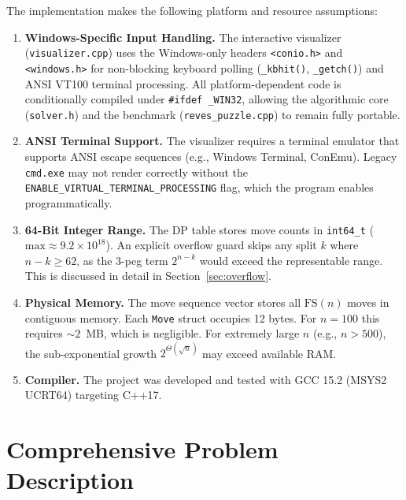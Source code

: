 \documentclass[12pt, a4paper]{article}
\begin{document}
The implementation makes the following platform and resource assumptions:

\begin{enumerate}[leftmargin=2em]

\item \textbf{Windows-Specific Input Handling.}
The interactive visualizer (\texttt{visualizer.cpp}) uses the Windows-only headers \texttt{<conio.h>} and \texttt{<windows.h>} for non-blocking keyboard polling (\texttt{\_kbhit()}, \texttt{\_getch()}) and ANSI VT100 terminal processing.
All platform-dependent code is conditionally compiled under \texttt{\#ifdef \_WIN32}, allowing the algorithmic core (\texttt{solver.h}) and the benchmark (\texttt{reves\_puzzle.cpp}) to remain fully portable.

\item \textbf{ANSI Terminal Support.}
The visualizer requires a terminal emulator that supports ANSI escape sequences (e.g., Windows Terminal, ConEmu).
Legacy \texttt{cmd.exe} may not render correctly without the \texttt{ENABLE\_VIRTUAL\_TERMINAL\_PROCESSING} flag, which the program enables programmatically.

\item \textbf{64-Bit Integer Range.}
The DP table stores move counts in \texttt{int64\_t} ($\text{max} \approx 9.2 \times 10^{18}$).
An explicit overflow guard skips any split $k$ where $n - k \geq 62$, as the 3-peg term $2^{n-k}$ would exceed the representable range.
This is discussed in detail in Section~\ref{sec:overflow}.

\item \textbf{Physical Memory.}
The move sequence vector stores all $\text{FS}(n)$ moves in contiguous memory.
Each \texttt{Move} struct occupies 12 bytes. For $n = 100$ this requires $\sim 2$~MB, which is negligible.
For extremely large $n$ (e.g., $n > 500$), the sub-exponential growth $2^{\Theta(\sqrt{n})}$ may exceed available RAM.

\item \textbf{Compiler.}
The project was developed and tested with GCC 15.2 (MSYS2 UCRT64) targeting C++17.

\end{enumerate}


\section{Comprehensive Problem Description}
\label{sec:problem}
\end{document}
